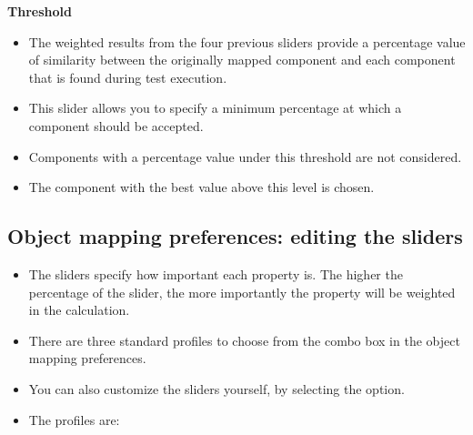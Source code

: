 \begin{itemize}
\textbf{Threshold}
\begin{itemize}
\item The weighted results from the four previous sliders provide a percentage value of similarity between the originally mapped component and each component that is found during test execution.    
\item This slider allows you to specify a minimum percentage at which a component should be accepted. 
\item Components with a percentage value under this threshold are not considered. 
\item The component with the best value above this level is chosen.
\end{itemize}
\end{itemize}

\subsection{Object mapping preferences: editing the sliders}
\label{tasksomprefedit}


\begin{itemize}
\item The sliders specify how important each property is. The higher the percentage of the slider, the more importantly the property will be weighted in the calculation.
\item There are three standard profiles to choose from the combo box in the object mapping preferences.
\item You can also customize the sliders yourself, by selecting the  option.
\item The profiles are:
\end{itemize}

